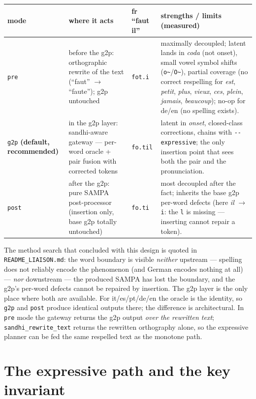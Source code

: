 \documentclass[11pt,a4paper]{report}
\newcommand{\smp}[1]{\texttt{#1}}          %
\newcommand{\tld}{\textasciitilde{}}      %
\begin{document}
\begin{center}
\begin{tabular}{@{}p{14mm}p{47mm}p{22mm}p{47mm}@{}}
\toprule
mode & where it acts & fr ``faut il'' & strengths / limits (measured) \\
\midrule
\smp{pre} & before the g2p: orthographic rewrite of the text
(``faut'' $\rightarrow$ ``faute''); g2p untouched &
\smp{fot.i} &
maximally decoupled; latent lands in \emph{coda} (not onset), small vowel
symbol shifts (\smp{o\tld}/\smp{O\tld}), partial coverage (no correct
respelling for \emph{est}, \emph{petit}, \emph{plus}, \emph{vieux}, \emph{ces},
\emph{plein}, \emph{jamais}, \emph{beaucoup}); no-op for de/en (no spelling
exists). \\[2mm]
\smp{g2p} \textbf{(default, recommended)} & in the g2p layer:
sandhi-aware gateway — per-word oracle + pair fusion with corrected tokens &
\smp{fo.til} &
latent in \emph{onset}, closed-class corrections, chains with
\smp{-{}-expressive}; the only insertion point that sees both the pair and
the pronunciation. \\[2mm]
\smp{post} & after the g2p: pure SAMPA post-processor (insertion only,
base g2p totally untouched) &
\smp{fo.ti} &
most decoupled after the fact; inherits the base g2p per-word defects (here
\emph{il} $\rightarrow$ \smp{i}: the \smp{l} is missing — inserting cannot
repair a token). \\
\bottomrule
\end{tabular}
\end{center}

The method search that concluded with this design is quoted in
\smp{README\_LIAISON.md}: the word boundary is visible \emph{neither}
upstream — spelling does not reliably encode the phenomenon (and German
encodes nothing at all) — \emph{nor} downstream — the produced SAMPA has
lost the boundary, and the g2p's per-word defects cannot be repaired by
insertion. The g2p layer is the only place where both are available. For
it/es/pt/de/en the oracle is the identity, so \smp{g2p} and \smp{post}
produce identical outputs there; the difference is architectural. In
\smp{pre} mode the gateway returns the g2p output \emph{over the rewritten
text}; \smp{sandhi\_rewrite\_text} returns the rewritten orthography alone,
so the expressive planner can be fed the same respelled text as the monotone
path.

\section{The expressive path and the key invariant}
\label{sec:invariant}
\end{document}
